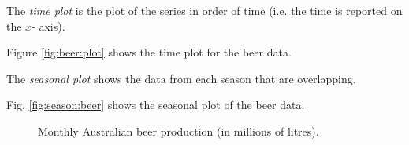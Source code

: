 \documentclass[a4paper,11pt,oneside,onecolumn]{book}
\begin{document}
\begin{definition}
The {\it time plot} is the plot of the series in order of time (i.e. the time is reported on the $x$- axis). 
\end{definition}
Figure \ref{fig:beer:plot} shows the time plot for the beer data. 



\begin{definition}
The {\it seasonal plot} shows  the data from each  season that are overlapping.
\end{definition}
 Fig. \ref{fig:season:beer} shows the seasonal plot of the beer data.



\begin{figure}[t]
\caption{Monthly Australian beer production (in millions of
 litres).}
\end{figure}

\end{document}
